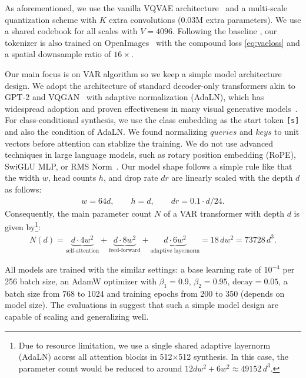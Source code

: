 As aforementioned, we use the vanilla VQVAE architecture~\cite{vqgan} and a multi-scale quantization scheme with $K$ extra convolutions (0.03M extra parameters).
We use a shared codebook for all scales with $V=4096$.
Following the baseline \cite{vqgan}, our tokenizer is also trained on OpenImages~\cite{openimages} with the compound loss \eqref{eq:vaeloss} and a spatial downsample ratio of $16\times$.


Our main focus is on VAR algorithm so we keep a simple model architecture design.
We adopt the architecture of standard decoder-only transformers akin to GPT-2 and VQGAN~\cite{gpt2,vqgan} with adaptive normalization (AdaLN), which has widespread adoption and proven effectiveness in many visual generative models~\cite{stylegan,stylegan2,stylegan3,stylegan-xl,stylegan-t,gigagan,dit,chen2023pixart}.
For class-conditional synthesis, we use the class embedding as the start token \texttt{[s]} and also the condition of AdaLN.
We found normalizing $queries$ and $keys$ to unit vectors before attention can stablize the training.
We do not use advanced techniques in large language models, such as rotary position embedding (RoPE), SwiGLU MLP, or RMS Norm~\cite{llama1,llama2}.
Our model shape follows a simple rule like \cite{scalinglaw} that the width $w$, head counts $h$, and drop rate $dr$ are linearly scaled with the depth $d$ as follows:
\begin{align}
    w = 64d,\quad\quad h = d,\quad\quad dr = 0.1\cdot d/24.
\end{align}\vspace{-3pt}
Consequently, the main parameter count $N$ of a VAR transformer with depth $d$ is given by\footnote{Due to resource limitation, we use a single shared adaptive layernorm (AdaLN) acorss all attention blocks in 512$\times$512 synthesis. In this case, the parameter count would be reduced to around $12dw^2 + 6w^2 \approx 49152\,d^3$.
}:
\vspace{1pt}
\begin{align}
    N(d) = \underbrace{d\cdot4w^2}_\text{self-attention} + \underbrace{d\cdot8w^2}_\text{feed-forward} + \underbrace{d\cdot6w^2}_\text{adaptive layernorm} = 18\,dw^2 = 73728\,d^3. \label{eq:param}
\end{align}\vspace{-4pt}

All models are trained with the similar settings: a base learning rate of $10^{-4}$ per 256 batch size, an AdamW optimizer with $\beta_1=0.9$, $\beta_2=0.95$, $\text{decay}=0.05$, a batch size from 768 to 1024 and training epochs from 200 to 350 (depends on model size).
The evaluations in  suggest that such a simple model design are capable of scaling and generalizing well.


    